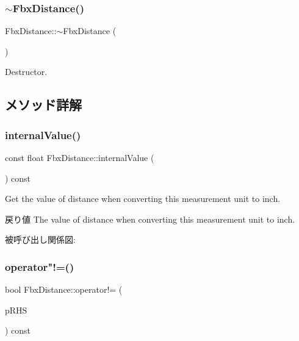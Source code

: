 \subsubsection{\texorpdfstring{$\sim$\+Fbx\+Distance()}{~FbxDistance()}}
{\footnotesize\ttfamily Fbx\+Distance\+::$\sim$\+Fbx\+Distance (\begin{DoxyParamCaption}{ }\end{DoxyParamCaption})}



Destructor. 



\subsection{メソッド詳解}
\mbox{\label{class_fbx_distance_a4a54ec421849ca6e2e43cfb400adbfc0}} 
\subsubsection{\texorpdfstring{internal\+Value()}{internalValue()}}
{\footnotesize\ttfamily const float Fbx\+Distance\+::internal\+Value (\begin{DoxyParamCaption}{ }\end{DoxyParamCaption}) const}

Get the value of distance when converting this measurement unit to inch. \begin{DoxyReturn}{戻り値}
The value of distance when converting this measurement unit to inch. 
\end{DoxyReturn}
被呼び出し関係図\+:
\mbox{\label{class_fbx_distance_a71b53170c900475723294c6257ebd861}} 
\subsubsection{\texorpdfstring{operator"!=()}{operator!=()}}
{\footnotesize\ttfamily bool Fbx\+Distance\+::operator!= (\begin{DoxyParamCaption}\item[{const \hyperlink{class_fbx_distance}{Fbx\+Distance} \&}]{p\+R\+HS }\end{DoxyParamCaption}) const}


